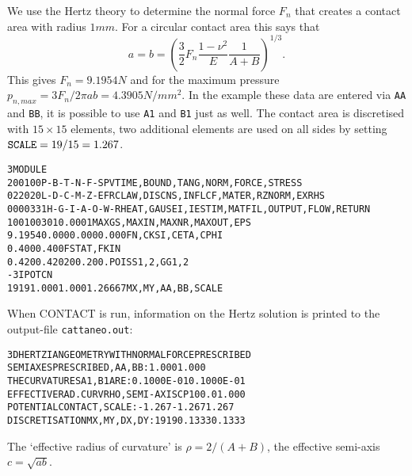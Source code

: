 \documentclass[12pt]{report}
\begin{document}
We use the Hertz theory to determine the normal force $F_n$ that creates a
contact area with radius $1\unit{mm}$.
For a circular contact area this says that
\begin{equation}
 a = b = \left( \frac{3}{2} F_n \frac{1-\nu^2}{E}
                         \frac{1}{A+B} \right)^{1/3}.
\end{equation}
This gives $F_n=9.1954\unit{N}$ and for the maximum pressure
$p_{n,max}=3F_n/2\pi ab=4.3905\unit{N/mm^2}$. In the example these data are
entered via {\tt AA} and {\tt BB}, it is possible to use {\tt A1} and
{\tt B1} just as well. The contact area is discretised with $15\times 15$
elements, two additional elements are used on all sides by setting
${\tt SCALE}=19/15=1.267$.
\begin{alltt}\small
 3  MODULE
  200100     P-B-T-N-F-S        PVTIME, BOUND , TANG  , NORM , FORCE, STRESS
  022020     L-D-C-M-Z-E        FRCLAW, DISCNS, INFLCF, MATER, RZNORM, EXRHS
 0000331   H-G-I-A-O-W-R  HEAT, GAUSEI, IESTIM, MATFIL, OUTPUT, FLOW, RETURN
   100   100    30     1   0.0001      MAXGS , MAXIN , MAXNR , MAXOUT, EPS
  9.1954      0.000        0.000       0.000        FN, CKSI, CETA, CPHI
  0.400       0.400                                 FSTAT, FKIN
  0.420       0.420          200.        200.       POISS 1,2,  GG 1,2
   -3                                               IPOTCN
   19   19     1.000       1.000      1.26667       MX,MY,AA,BB,SCALE
\end{alltt}
When CONTACT is run, information on the Hertz solution is printed to the
output-file {\tt cattaneo\-.out}:
\begin{alltt}\small
 3D HERTZIAN GEOMETRY WITH NORMAL FORCE PRESCRIBED
 SEMIAXES PRESCRIBED, AA,BB:                  1.000       1.000
 THE CURVATURES A1,B1 ARE:                   0.1000E-01  0.1000E-01
 EFFECTIVE RAD.CURV RHO, SEMI-AXIS CP         100.0       1.000
 POTENTIAL CONTACT, SCALE:                   -1.267      -1.267       1.267
 DISCRETISATION MX,MY, DX,DY:                  19    19  0.1333      0.1333
\end{alltt}
The `effective radius of curvature' is $\rho=2/(A+B)$, the effective
semi-axis $c=\sqrt{ab}$.
\end{document}
